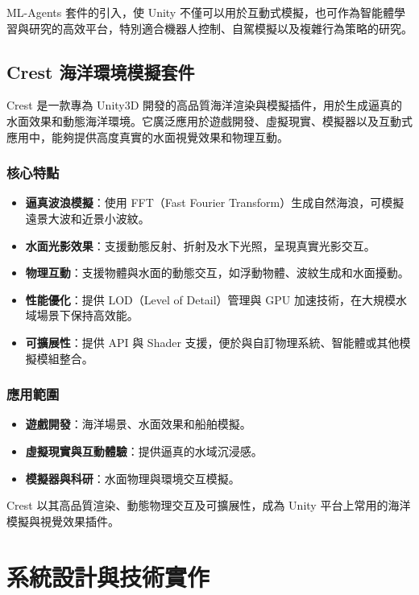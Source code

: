 \documentclass[12pt,a4paper]{article}
\begin{document}
ML-Agents 套件的引入，使 Unity 不僅可以用於互動式模擬，也可作為智能體學習與研究的高效平台，特別適合機器人控制、自駕模擬以及複雜行為策略的研究。


\subsection{Crest 海洋環境模擬套件}
Crest 是一款專為 Unity3D 開發的高品質海洋渲染與模擬插件，用於生成逼真的水面效果和動態海洋環境。它廣泛應用於遊戲開發、虛擬現實、模擬器以及互動式應用中，能夠提供高度真實的水面視覺效果和物理互動。

\subsubsection{核心特點}
\begin{itemize}
    \item \textbf{逼真波浪模擬}：使用 FFT（Fast Fourier Transform）生成自然海浪，可模擬遠景大波和近景小波紋。
    \item \textbf{水面光影效果}：支援動態反射、折射及水下光照，呈現真實光影交互。
    \item \textbf{物理互動}：支援物體與水面的動態交互，如浮動物體、波紋生成和水面擾動。
    \item \textbf{性能優化}：提供 LOD（Level of Detail）管理與 GPU 加速技術，在大規模水域場景下保持高效能。
    \item \textbf{可擴展性}：提供 API 與 Shader 支援，便於與自訂物理系統、智能體或其他模擬模組整合。
\end{itemize}

\subsubsection{應用範圍}
\begin{itemize}
    \item \textbf{遊戲開發}：海洋場景、水面效果和船舶模擬。
    \item \textbf{虛擬現實與互動體驗}：提供逼真的水域沉浸感。
    \item \textbf{模擬器與科研}：水面物理與環境交互模擬。
\end{itemize}

Crest 以其高品質渲染、動態物理交互及可擴展性，成為 Unity 平台上常用的海洋模擬與視覺效果插件。


\section{系統設計與技術實作}
\end{document}
